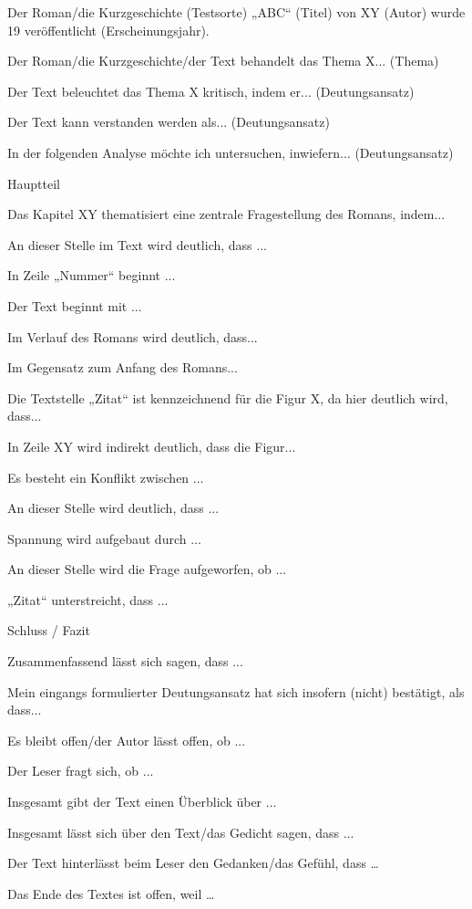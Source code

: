 \begin{compactitem}
    \item Der Roman/die Kurzgeschichte (Testsorte) „ABC“ (Titel) von XY (Autor) wurde 19 veröffentlicht (Erscheinungsjahr). 
    \item Der Roman/die Kurzgeschichte/der Text behandelt das Thema X... (Thema) 
    \item Der Text beleuchtet das Thema X kritisch, indem er... (Deutungsansatz) 
    \item Der Text kann verstanden werden als... (Deutungsansatz) 
    \item In der folgenden Analyse möchte ich untersuchen, inwiefern... (Deutungsansatz)
\end{compactitem}
Hauptteil
\begin{compactitem}
    \item Das Kapitel XY thematisiert eine zentrale Fragestellung des Romans, indem... 
    \item An dieser Stelle im Text wird deutlich, dass ... 
    \item In Zeile „Nummer“ beginnt ... 
    \item Der Text beginnt mit ... 
    \item  Im Verlauf des Romans wird deutlich, dass... 
    \item Im Gegensatz zum Anfang des Romans... 
    \item  Die Textstelle „Zitat“ ist kennzeichnend für die Figur X, da hier deutlich wird, dass... 
    \item In Zeile XY wird indirekt deutlich, dass die Figur... 
    \item Es besteht ein Konflikt zwischen ... 
    \item An dieser Stelle wird deutlich, dass ... 
    \item Spannung wird aufgebaut durch ... 
    \item An dieser Stelle wird die Frage aufgeworfen, ob ... 
    \item „Zitat“ unterstreicht, dass ... 
\end{compactitem}
Schluss / Fazit
\begin{compactitem}
    \item Zusammenfassend lässt sich sagen, dass ... 
    \item  Mein eingangs formulierter Deutungsansatz hat sich insofern (nicht) bestätigt, als dass... 
    \item Es bleibt offen/der Autor lässt offen, ob ... 
    \item Der Leser fragt sich, ob ... 
    \item Insgesamt gibt der Text einen Überblick über ... 
    \item Insgesamt lässt sich über den Text/das Gedicht sagen, dass ... 
    \item Der Text hinterlässt beim Leser den Gedanken/das Gefühl, dass … 
    \item  Das Ende des Textes ist offen, weil … 
\end{compactitem}
